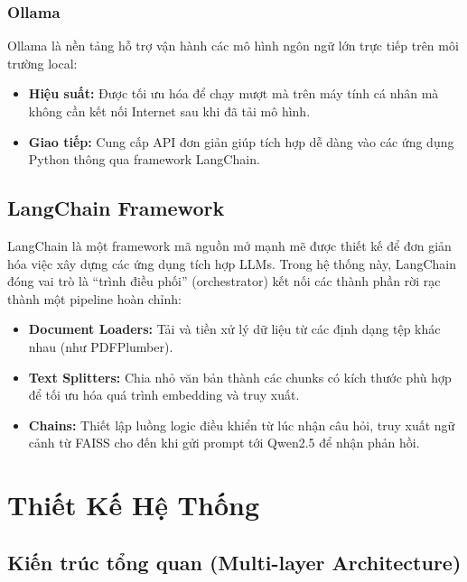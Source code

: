 \documentclass[conference]{IEEEtran}
\begin{document}
\subsubsection{Ollama}
Ollama là nền tảng hỗ trợ vận hành các mô hình ngôn ngữ lớn trực tiếp trên môi trường local:
\begin{itemize}
  \item \textbf{Hiệu suất:} Được tối ưu hóa để chạy mượt mà trên máy tính cá nhân mà không cần kết nối Internet sau khi đã tải mô hình.
  \item \textbf{Giao tiếp:} Cung cấp API đơn giản giúp tích hợp dễ dàng vào các ứng dụng Python thông qua framework LangChain.
\end{itemize}

\subsection{LangChain Framework}

LangChain là một framework mã nguồn mở mạnh mẽ được thiết kế để đơn giản hóa việc xây dựng các ứng dụng tích hợp LLMs. Trong hệ thống này, LangChain đóng vai trò là ``trình điều phối'' (orchestrator) kết nối các thành phần rời rạc thành một pipeline hoàn chỉnh:
\begin{itemize}
  \item \textbf{Document Loaders:} Tải và tiền xử lý dữ liệu từ các định dạng tệp khác nhau (như PDFPlumber).
  \item \textbf{Text Splitters:} Chia nhỏ văn bản thành các chunks có kích thước phù hợp để tối ưu hóa quá trình embedding và truy xuất.
  \item \textbf{Chains:} Thiết lập luồng logic điều khiển từ lúc nhận câu hỏi, truy xuất ngữ cảnh từ FAISS cho đến khi gửi prompt tới Qwen2.5 để nhận phản hồi.
\end{itemize}

\section{Thiết Kế Hệ Thống}

\subsection{Kiến trúc tổng quan (Multi-layer Architecture)}
\end{document}

